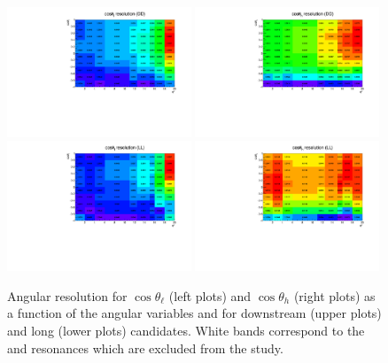 \begin{figure}
\centering
\includegraphics[width=0.49\textwidth]{Lmumu/figs/resolution/resolution2D_cosThetaL_DD.pdf}
\includegraphics[width=0.49\textwidth]{Lmumu/figs/resolution/resolution2D_cosThetaB_DD.pdf} \\
\includegraphics[width=0.49\textwidth]{Lmumu/figs/resolution/resolution2D_cosThetaL_LL.pdf}
\includegraphics[width=0.49\textwidth]{Lmumu/figs/resolution/resolution2D_cosThetaB_LL.pdf}
\caption{Angular resolution for $\cos \theta_\ell$ (left plots) and  $\cos \theta_h$ (right plots)
as a function of the angular variables and \qsq for downstream (upper plots) and
long (lower plots) candidates. White bands correspond to the \jpsi and \psitwos resonances
which are excluded from the study.}
\label{fig:avgResol}
\end{figure}


